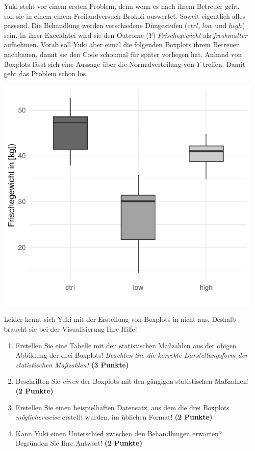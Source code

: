\documentclass[a4paper, 9pt]{scrartcl}\usepackage[]{graphicx}\usepackage[]{xcolor}
\makeatletter
\def\maxwidth{ %
  \ifdim\Gin@nat@width>\linewidth
    \linewidth
  \else
    \Gin@nat@width
  \fi
}
\makeatother
\begin{document}
Yuki steht vor einem ersten Problem, denn wenn es nach ihrem Betreuer geht, soll sie in einem einem Freilandversuch Brokoli auswertet. Soweit eigentlich alles passend. Die Behandlung werden verschiedene Düngestufen ($ctrl$, $low$ und $high$) sein. In ihrer Exceldatei wird sie den Outcome ($Y$) \textit{Frischegewicht} als \textit{freshmatter} aufnehmen. Vorab soll Yuki aber eimal die folgenden Boxplots ihrem Betreuer nachbauen, damit sie den \Rlogo Code schonmal für später vorliegen hat. Anhand von Boxplots lässt sich eine Aussage über die Normalverteilung von $Y$ treffen. Damit geht das Problem schon los.



{\centering \includegraphics[width=\maxwidth]{img/boxplot-02-zer-1} 

}




Leider kennt sich Yuki mit der Erstellung von Boxplots in \Rlogo nicht aus. Deshalb braucht sie bei der Visualisierung Ihre Hilfe!

\begin{enumerate}
\item Erstellen Sie eine Tabelle mit den statistischen Maßzahlen aus der obigen Abbildung der drei Boxplots! \textit{Beachten Sie die korrekte Darstellungsform der statistischen Maßzahlen!} \textbf{(3 Punkte)}
\item Beschriften Sie \textit{einen} der Boxplots mit den gängigen statistischen Maßzahlen! \textbf{(2 Punkte)}
\item Erstellen Sie einen beispielhaften Datensatz, aus dem die drei Boxplots \textit{möglicherweise} erstellt wurden, im \Rlogo üblichen Format! \textbf{(2 Punkte)}
\item Kann Yuki einen Unterschied zwischen den Behandlungen erwarten? Begründen Sie Ihre Antwort! \textbf{(2 Punkte)}
\end{enumerate} 
\clearpage
\end{document}
